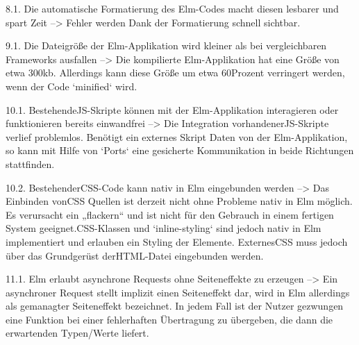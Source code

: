  8.1. Die automatische Formatierung des Elm-Codes macht diesen lesbarer und spart Zeit
 --> Fehler werden Dank der Formatierung schnell sichtbar.
 
 9.1. Die Dateigröße der Elm-Applikation wird kleiner als bei vergleichbaren Frameworks ausfallen
 --> Die kompilierte Elm-Applikation hat eine Größe von etwa 300kb. Allerdings kann diese Größe um etwa 60Prozent verringert werden, wenn der Code `minified` wird.

10.1. Bestehende\ac{JS}-Skripte können mit der Elm-Applikation interagieren oder funktionieren bereits einwandfrei
--> Die Integration vorhandener\ac{JS}-Skripte verlief problemlos. Benötigt ein externes Skript Daten von der Elm-Applikation, so kann mit Hilfe von `Ports` eine gesicherte Kommunikation in beide Richtungen stattfinden.

10.2. Bestehender\ac{CSS}-Code kann nativ in Elm eingebunden werden
--> Das Einbinden von\ac{CSS} Quellen ist derzeit nicht ohne Probleme nativ in Elm möglich. Es verursacht ein „flackern“ und ist nicht für den Gebrauch in einem fertigen System geeignet.\ac{CSS}-Klassen und `inline-styling` sind jedoch nativ in Elm implementiert und erlauben ein Styling der Elemente. Externes\ac{CSS} muss jedoch über das Grundgerüst der\ac{HTML}-Datei eingebunden werden.

11.1. Elm erlaubt asynchrone Requests ohne Seiteneffekte zu erzeugen
--> Ein asynchroner Request stellt implizit einen Seiteneffekt dar, wird in Elm allerdings als gemanagter Seiteneffekt bezeichnet. In jedem Fall ist der Nutzer gezwungen eine Funktion bei einer fehlerhaften Übertragung zu übergeben, die dann die erwartenden Typen/Werte liefert.



